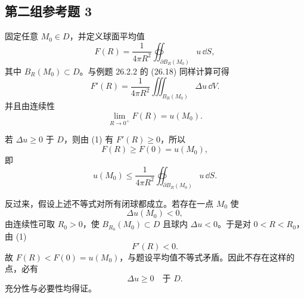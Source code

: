 \subsection*{第二组参考题 3}
\begin{xsolution}
固定任意 $M_0\in D$，并定义球面平均值
\[
  F(R)=\frac{1}{4\pi R^2}\oiint_{\partial B_R(M_0)}u\,\dd S,
\]
其中 $B_R(M_0)\subset D$。与例题 26.2.2 的 (26.18) 同样计算可得
\begin{equation}
  F'(R)=\frac{1}{4\pi R^2}\iiint_{B_R(M_0)}\Delta u\,\dd V.
  \tag{1}
\end{equation}
并且由连续性
\[
  \lim_{R\to0^+}F(R)=u(M_0).
\]

若 $\Delta u\ge0$ 于 $D$，则由 (1) 有 $F'(R)\ge0$，所以
\[
  F(R)\ge F(0)=u(M_0),
\]
即
\[
  u(M_0)\le\frac{1}{4\pi R^2}
  \oiint_{\partial B_R(M_0)}u\,\dd S.
\]

反过来，假设上述不等式对所有闭球都成立。若存在一点 $M_0$ 使
\[
  \Delta u(M_0)<0,
\]
由连续性可取 $R_0>0$，使 $B_{R_0}(M_0)\subset D$ 且球内 $\Delta u<0$。于是对 $0<R<R_0$，由 (1)
\[
  F'(R)<0.
\]
故 $F(R)<F(0)=u(M_0)$，与题设平均值不等式矛盾。因此不存在这样的点，必有
\[
  \Delta u\ge0\quad\text{于 }D.
\]
充分性与必要性均得证。
\end{xsolution}

